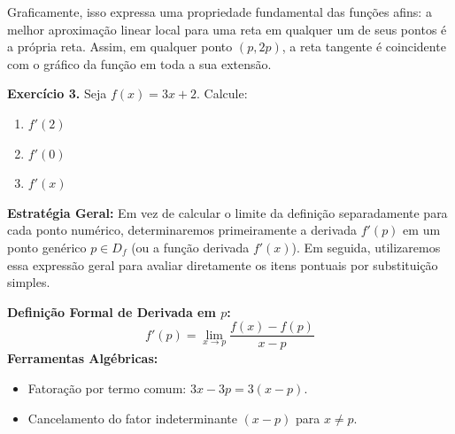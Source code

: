 Graficamente, isso expressa uma propriedade fundamental das funções afins: a melhor aproximação linear local para uma reta em qualquer um de seus pontos é a própria reta. Assim, em qualquer ponto $(p, 2p)$, a reta tangente é coincidente com o gráfico da função em toda a sua extensão.

\begin{center}
\end{center}

\vspace{0.6cm}
\noindent\textbf{Exercício 3.} Seja $f(x) = 3x + 2$. Calcule:
\begin{enumerate}[label=\alph*)]
    \item $f'(2)$
    \item $f'(0)$
    \item $f'(x)$
\end{enumerate}
\setcounter{equation}{0}

\begin{recursosbox}[title=Estratégia e Recursos Utilizados]
\textbf{Estratégia Geral:} Em vez de calcular o limite da definição separadamente para cada ponto numérico, determinaremos primeiramente a derivada $f'(p)$ em um ponto genérico $p \in D_f$ (ou a função derivada $f'(x)$). Em seguida, utilizaremos essa expressão geral para avaliar diretamente os itens pontuais por substituição simples.

\vspace{0.2cm}
\textbf{Definição Formal de Derivada em $p$:}
\[
f'(p) = \lim_{x \to p} \frac{f(x) - f(p)}{x - p}
\]
\textbf{Ferramentas Algébricas:}
\begin{itemize}[noitemsep, topsep=2pt]
    \item Fatoração por termo comum: $3x - 3p = 3(x - p)$.
    \item Cancelamento do fator indeterminante $(x - p)$ para $x \neq p$.
\end{itemize}
\end{recursosbox}

